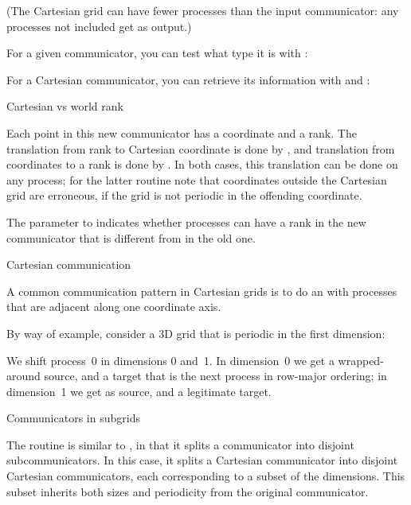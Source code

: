 (The Cartesian grid can have fewer processes than the input communicator:
any processes not included get  as output.)

For a given communicator, you can test what type it is
with :
%

For a Cartesian communicator, you can retrieve
its information with 
and :
%

 {Cartesian vs world rank}

Each point in this new communicator has a coordinate and a rank.
The translation from rank to Cartesian coordinate is done by 
,
and translation from coordinates to a rank is done by
.
In both cases, this translation can be done on any process;
for the latter routine note that coordinates outside the
Cartesian grid are erroneous,
if the grid is not periodic in the offending coordinate.


The  parameter to 
indicates whether processes can have a rank
in the new communicator that is different from in the old one.

 {Cartesian communication}

A common communication pattern in Cartesian grids is to
do an  with processes that are adjacent
along one coordinate axis.

By way of example, consider a 3D grid that is periodic in the first dimension:
%

We shift process~0 in dimensions 0 and~1.
In dimension~0 we get a wrapped-around source,
and a target that is the next process in row-major ordering;
in dimension~1 we get  as source,
and a legitimate target.
%

 {Communicators in subgrids}

The routine  is similar to
, in that it splits a communicator
into disjoint subcommunicators.
In this case, it splits a Cartesian communicator
into disjoint Cartesian communicators,
each corresponding to a subset of the dimensions.
This subset inherits both sizes and periodicity from the original communicator.

